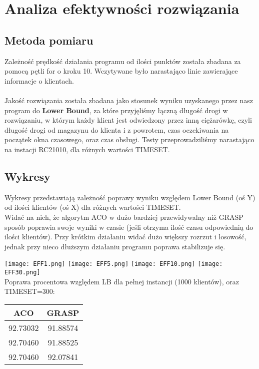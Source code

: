 \documentclass[a4paper]{article}
\begin{document}
\section{Analiza efektywności rozwiązania}
\subsection{Metoda pomiaru}
Zależność prędkość działania programu od ilości punktów została zbadana za pomocą  pętli for o kroku 10. Wczytywane było narastająco linie zawierające informacje o klientach.\\
\\
Jakość rozwiązania została zbadana jako stosunek wyniku uzyskanego przez nasz program do \textbf{Lower Bound}, za które przyjęliśmy łączną długość drogi w rozwiązaniu, w którym każdy klient jest odwiedzony przez inną ciężarówkę, czyli długość drogi od magazynu do klienta i z powrotem, czas oczekiwania na początek okna czasowego, oraz czas obsługi. Testy przeprowadziliśmy narastająco na instacji RC21010, dla różnych wartości TIMESET.

\subsection{Wykresy}
Wykresy przedstawiają zależność poprawy wyniku względem Lower Bound (oś Y) od ilości klientów (oś X) dla różnych wartości TIMESET.\\
Widać na nich, że algorytm ACO w dużo bardziej przewidywalny niż GRASP sposób poprawia swoje wyniki w czasie (jeśli otrzyma ilość czasu odpowiednią do ilości klientów). Przy krótkim działaniu widać dużo większy rozrzut i losowość, jednak przy nieco dłuższym działaniu programu poprawa stabilizuje się.
\begin{center}
\texttt{[image: EFF1.png]}
\texttt{[image: EFF5.png]}
\texttt{[image: EFF10.png]}
\texttt{[image: EFF30.png]}
\\
Poprawa procentowa względem LB dla pełnej instancji (1000 klientów), oraz TIMESET=300:\\
\begin{tabular}{|c|c|}
\hline
ACO & GRASP \\
\hline
92.73032 & 91.88574 \\
\hline
92.70460 & 91.88525 \\
 \hline
92.70460 & 92.07841 \\
 \hline
\end{tabular}
\end{center}
\end{document}
